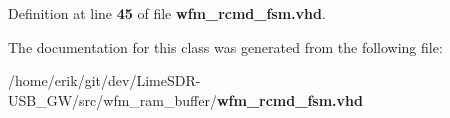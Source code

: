 Definition at line {\bf 45} of file {\bf wfm\+\_\+rcmd\+\_\+fsm.\+vhd}.



The documentation for this class was generated from the following file\+:\begin{DoxyCompactItemize}
\item 
/home/erik/git/dev/\+Lime\+S\+D\+R-\/\+U\+S\+B\+\_\+\+G\+W/src/wfm\+\_\+ram\+\_\+buffer/{\bf wfm\+\_\+rcmd\+\_\+fsm.\+vhd}\end{DoxyCompactItemize}
